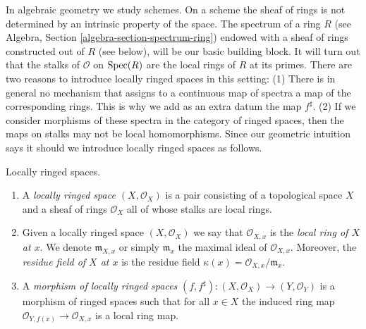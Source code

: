 \medskip\noindent
In algebraic geometry we study schemes. On a scheme the sheaf of rings
is not determined by an intrinsic property of the space.
The spectrum of a ring $R$
(see Algebra, Section \ref{algebra-section-spectrum-ring}) endowed
with a sheaf of rings constructed out of $R$ (see below),
will be our basic building block. It will turn out that
the stalks of $\mathcal{O}$ on $\mathop{\mathrm{Spec}}(R)$ are the local
rings of $R$ at its primes. There are two reasons to introduce
locally ringed spaces in this setting: (1) There is in general
no mechanism that assigns to a continuous map of spectra a
map of the corresponding rings. This is why we add as an extra datum
the map $f^\sharp$. (2) If we consider morphisms
of these spectra in the category of ringed spaces, then the
maps on stalks may not be local homomorphisms. Since our
geometric intuition says it should we introduce locally ringed spaces
as follows.

\begin{definition}
\label{definition-locally-ringed-space}
\begin{reference}
\cite[Chapter II, \S 1, nos. 32 and 35, pp. 225 and 228]{FAC}
\end{reference}
Locally ringed spaces.
\begin{enumerate}
\item A {\it locally ringed space $(X, \mathcal{O}_X)$}
is a pair consisting of a
topological space $X$ and a sheaf of rings $\mathcal{O}_X$ all of whose stalks
are local rings.
\item Given a locally ringed space $(X, \mathcal{O}_X)$ we say that
$\mathcal{O}_{X, x}$ is the {\it local ring of $X$ at $x$}.
We denote $\mathfrak{m}_{X, x}$ or simply $\mathfrak{m}_x$
the maximal ideal of $\mathcal{O}_{X, x}$. Moreover, the
{\it residue field of $X$ at $x$} is the residue field
$\kappa(x) = \mathcal{O}_{X, x}/\mathfrak{m}_x$.
\item A {\it morphism of locally ringed spaces}
$(f, f^\sharp) : (X, \mathcal{O}_X) \to (Y, \mathcal{O}_Y)$
is a morphism of ringed spaces such that for all $x \in X$
the induced ring map $\mathcal{O}_{Y, f(x)} \to \mathcal{O}_{X, x}$ is a
local ring map.
\end{enumerate}
\end{definition}

